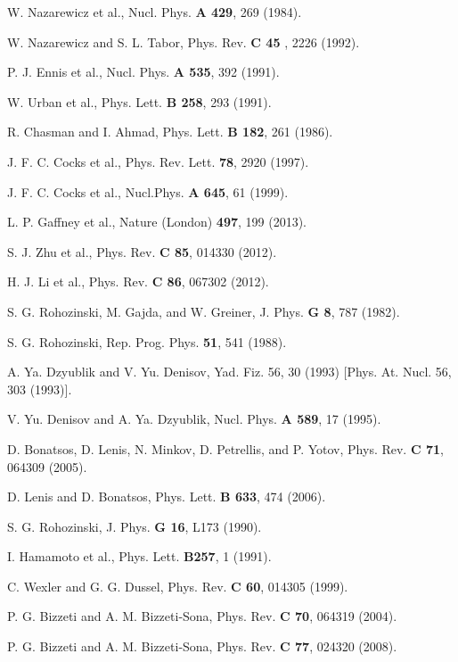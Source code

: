 \documentclass[twocolumn,prc,showpacs,preprintnumbers,superscriptaddress,floatfix]{revtex4}
\begin{document}
\begin{thebibliography}{99}
 W. Nazarewicz et al., Nucl. Phys. \textbf{A 429}, 269
(1984).

 W. Nazarewicz and S. L. Tabor, Phys. Rev. \textbf{C 45%
}, 2226 (1992).

 P. J. Ennis et al., Nucl. Phys. \textbf{A 535}, 392 (1991).

 W. Urban et al., Phys. Lett. \textbf{B 258}, 293 (1991).

 R. Chasman and I. Ahmad, Phys. Lett. \textbf{B 182}, 261
(1986).

 J. F. C. Cocks et al., Phys. Rev. Lett. \textbf{78}, 2920
(1997).

 J. F. C. Cocks et al., Nucl.Phys. \textbf{A 645}, 61
(1999).

 L. P. Gaffney et al., Nature (London) \textbf{497}, 199
(2013).

 S. J. Zhu et al., Phys. Rev. \textbf{C 85}, 014330 (2012).

 H. J. Li et al., Phys. Rev. \textbf{C 86}, 067302 (2012).

 S. G. Rohozinski, M. Gajda, and W. Greiner, J. Phys.
\textbf{G 8}, 787 (1982).

 S. G. Rohozinski, Rep. Prog. Phys. \textbf{51}, 541
(1988).

 A. Ya. Dzyublik and V. Yu. Denisov, Yad. Fiz. 56, 30
(1993) [Phys. At. Nucl. 56, 303 (1993)].

 V. Yu. Denisov and A. Ya. Dzyublik, Nucl. Phys. \textbf{%
A 589}, 17 (1995).

 D. Bonatsos, D. Lenis, N. Minkov, D. Petrellis, and P.
Yotov, Phys. Rev. \textbf{C 71}, 064309 (2005).

 D. Lenis and D. Bonatsos, Phys. Lett. \textbf{B 633}, 474
(2006).

 S. G. Rohozinski, J. Phys. \textbf{G 16}, L173 (1990).

 I. Hamamoto et al., Phys. Lett. \textbf{B257}, 1 (1991).

 C. Wexler and G. G. Dussel, Phys. Rev. \textbf{C 60},
014305 (1999).

 P. G. Bizzeti and A. M. Bizzeti-Sona, Phys. Rev. \textbf{%
C 70}, 064319 (2004).

 P. G. Bizzeti and A. M. Bizzeti-Sona, Phys. Rev. \textbf{%
C 77}, 024320 (2008).


\end{thebibliography}
\end{document}
